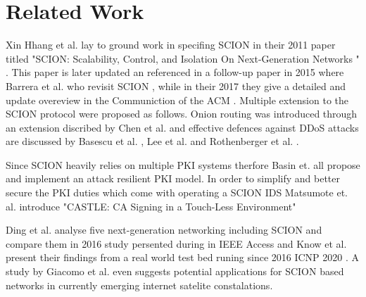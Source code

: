 \documentclass[../eva1_scion.tex]{subfiles}
\begin{document}
    \chapter{Related Work}\label{ch:related_work}

    Xin Hhang et al. lay to ground work in specifing SCION in their 2011 paper titled "SCION: Scalability, Control, and Isolation On Next-Generation Networks
" \cite{scion_2011}. This paper is later updated an referenced in a follow-up paper in 2015 where Barrera et al. who revisit SCION \cite{scion_2015}, while in their 2017 they give a detailed and update overeview in the Communiction of the ACM \cite{scion_2017}. Multiple extension to the SCION protocol were proposed as follows. Onion routing was introduced through an extension discribed by Chen et al. \cite{hornet_2015, hornet_2016} and effective defences against DDoS attacks are discussed by Basescu et al. \cite{sibra_2016}, Lee et al. \cite{lee_2017} and Rothenberger et al. \cite{piskes_2020}.

Since SCION heavily relies on multiple PKI systems therfore Basin et. all propose \cite{arpki_2014} and implement \cite{arpki_2018} an attack resilient PKI model. In order to simplify and better secure the PKI duties which come with operating a SCION IDS Matsumote et. al. introduce "CASTLE: CA Signing in a Touch-Less Environment" \cite{castle_2016} 

Ding et al. analyse five next-generation networking including SCION and compare them in 2016 study persented during in IEEE Access \cite{ding_2016} and Know et al. present their findings from a real world test bed runing since 2016 ICNP 2020 \cite{testbed_2020}. A study by Giacomo et al. even suggests potential applications for SCION based networks in currently emerging internet satelite constalations.\cite{giuliari_2020}
\end{document}
